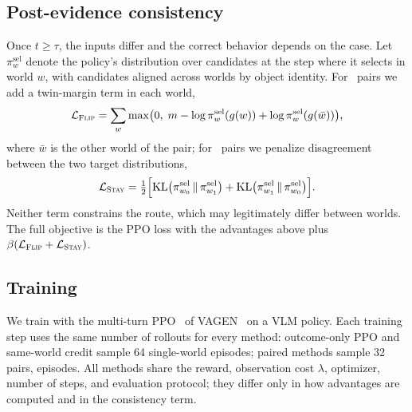 \subsection{Post-evidence consistency}
Once $t \ge \tau$, the inputs differ and the correct behavior depends on the case.
Let $\pi^{\mathrm{sel}}_w$ denote the policy's distribution over candidates at the step where it selects in world $w$, with candidates aligned across worlds by object identity.
For \Flip\ pairs we add a twin-margin term in each world,
\begin{equation}
\mathcal{L}_{\textsc{Flip}} = \sum_{w} \max\!\big(0,\; m - \log \pi^{\mathrm{sel}}_w(g(w)) + \log \pi^{\mathrm{sel}}_w(g(\bar w))\big),
\end{equation}
where $\bar w$ is the other world of the pair; for \Stay\ pairs we penalize disagreement between the two target distributions,
\begin{equation}
\mathcal{L}_{\textsc{Stay}} = \tfrac12\Big[\mathrm{KL}\big(\pi^{\mathrm{sel}}_{w_0} \,\|\, \pi^{\mathrm{sel}}_{w_1}\big) + \mathrm{KL}\big(\pi^{\mathrm{sel}}_{w_1} \,\|\, \pi^{\mathrm{sel}}_{w_0}\big)\Big].
\end{equation}
Neither term constrains the route, which may legitimately differ between worlds.
The full objective is the PPO loss with the advantages above plus $\beta(\mathcal{L}_{\textsc{Flip}} + \mathcal{L}_{\textsc{Stay}})$.

\subsection{Training}
We train with the multi-turn PPO~\cite{ppo2017} of VAGEN~\cite{vagen2025} on a VLM policy.
Each training step uses the same number of rollouts for every method: outcome-only PPO and same-world credit sample 64 single-world episodes; paired methods sample 32 pairs,  episodes.
All methods share the reward, observation cost $\lambda$, optimizer, number of steps, and evaluation protocol; they differ only in how advantages are computed and in the consistency term.
